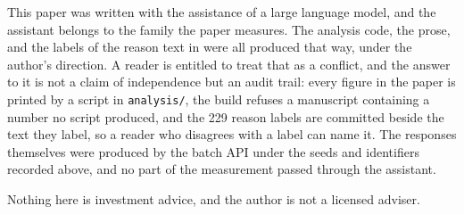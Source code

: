 This paper was written with the assistance of a large language model, and
the assistant belongs to the family the paper measures. The analysis code,
the prose, and the labels of the reason text in  were all
produced that way, under the author's direction. A reader is entitled to
treat that as a conflict, and the answer to it is not a claim of
independence but an audit trail: every figure in the paper is printed by a
script in \texttt{analysis/}, the build refuses a manuscript containing a
number no script produced, and the 229 reason labels are committed beside
the text they label, so a reader who disagrees with a label can name it. The
responses themselves were produced by the batch API under the seeds and
identifiers recorded above, and no part of the measurement passed through
the assistant.

Nothing here is investment advice, and the author is not a licensed adviser.
